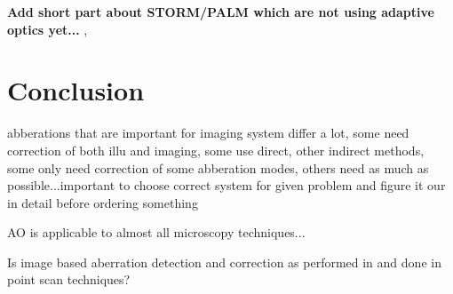 \textbf{Add short part about STORM/PALM which are not using adaptive optics yet...
} \cite{future_AOM_PALM_1}, 
\section{Conclusion}
\label{sec:Conclusion}

abberations that are important for imaging system differ a lot, some need 
correction of both illu and imaging, some use direct, other indirect methods, 
some only need correction of some abberation modes, others need as much as 
possible...important to choose correct system for given problem and figure it 
our in detail before ordering something

AO is applicable to almost all microscopy techniques...

Is image based aberration detection and correction as performed in \cite{wide_AOM_loew_freq} and \cite{wide_AOM_structured_illu} done in point scan techniques?


\clearpage